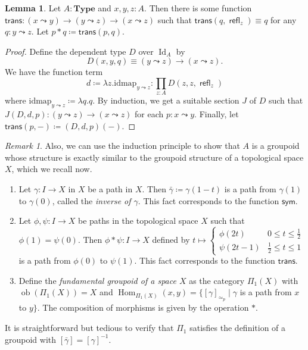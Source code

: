 \documentclass[10pt,letterpaper,cm]{nupset}
\theoremstyle{definition}
\theoremstyle{theorem}
\newtheorem{lemma}[definition]{Lemma}
\theoremstyle{remark}
\newtheorem{remark}[definition]{Remark}
\newcommand{\1}{\mathbf{1}}
\newcommand{\0}{\vec 0}
\DeclareMathOperator{\id}{Id}
\DeclareMathOperator{\ob}{ob}
\DeclareMathOperator{\refl}{\mathsf{refl}}
\DeclareMathOperator{\Hom}{Hom}
\begin{document}
\begin{lemma}
Let $A: \mathbf{Type}$ and $x,y,z: A$. Then there is some function $\mathsf{trans} : (x\leadsto y) \to (y \leadsto z) \to (x \leadsto z)$ such that $\mathsf{trans}(q, \refl_z) \equiv q$ for any $q: y \leadsto z$. Let $p \ast q \coloneqq \mathsf{trans}(p,q)$.
\end{lemma}
\begin{proof}
Define the dependent type $D$ over $\id_A$ by $$D(x, y, q) \equiv (y \leadsto z) \to (x \leadsto z).$$ We have the function term $$d \coloneqq\lambda z.\text{idmap}_{y\leadsto z} : \prod_{z: A} D(z, z, \refl_z)$$ where $\text{idmap}_{y\leadsto z} \coloneqq \lambda q.q$. By induction, we get a suitable section $J$ of $D$ such that $J(D, d, p) : (y \leadsto z) \to (x\leadsto z)$ for each $p: x\leadsto y$.  Finally, let $\mathsf{trans}(p, -) \coloneqq (D, d, p)(-)$.
\end{proof}

\begin{remark} Also, we can use the induction principle to show that $A$ is a groupoid whose structure is exactly similar to the groupoid structure of a topological space $X$, which we recall now.
\begin{enumerate}
\item Let $\gamma : I \to X$ in $X$ be a path in $X$. Then $\bar{\gamma}\coloneqq \gamma(1-t)$ is a path from $\gamma(1)$ to $\gamma(0)$, called the \textit{inverse of $\gamma$}. This fact corresponds to the function $\mathsf{sym}$. 
\item Let $\phi, \psi: I \to X$ be paths in the topological space $X$ such that $\phi(1) = \psi(0)$. Then $\phi \ast \psi : I \to X$ defined by  $t\mapsto  \begin{cases} \phi(2t) & 0\leq t \leq \frac{1}{2} \\ \psi(2t-1) & \frac{1}{2} \leq t \leq 1 \end{cases}$ is a path from $\phi(0)$ to $\psi(1)$. This fact corresponds to the function $\mathsf{trans}$.
\item Define the \textit{fundamental groupoid of a space $X$} as the category $\Pi_1(X)$ with $\ob(\Pi_1(X)) = X$ and $\Hom_{\Pi_1(X)}(x,y) = \{[\gamma]_{\simeq_p} \mid \gamma$ is a path from $x$ to $y\}$. The composition of morphisms is given by the operation $\ast$. 
\end{enumerate}
It is straightforward but tedious to verify that $\Pi_1$ satisfies the definition of a groupoid with $[\bar{\gamma}] = [\gamma]^{-1}$.
\end{remark}
\end{document}
